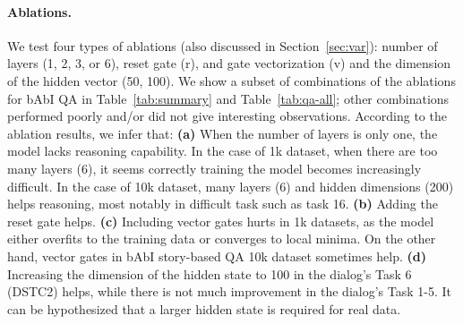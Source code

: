 \documentclass[table]{article}
\begin{document}
\paragraph{Ablations.}
We test four types of ablations (also discussed in Section~\ref{sec:var}): number of layers (1, 2, 3, or 6), reset gate (r), and gate vectorization (v) and the dimension of the hidden vector (50, 100). 
We show a subset of combinations of the ablations for bAbI QA in Table~\ref{tab:summary} and Table~\ref{tab:qa-all}; other combinations performed poorly and/or did not give interesting observations.
According to the ablation results, we  infer that:
{\bf (a)} When the number of layers is only one, the model lacks reasoning capability. In the case of 1k dataset, when there are too many layers (6), it seems correctly training the model becomes increasingly difficult. In the case of 10k dataset, many layers (6) and hidden dimensions (200) helps reasoning, most notably in difficult task such as task 16.
{\bf (b)} Adding the reset gate helps.
{\bf (c)} Including vector gates hurts in 1k datasets, as the model either overfits to the training data or converges to local minima. On the other hand, vector gates in bAbI story-based QA 10k dataset sometimes help.
{\bf (d)} Increasing the dimension of the hidden state to 100 in the dialog's Task 6 (DSTC2) helps, while there is not much improvement in the dialog's Task 1-5. 
It can be hypothesized that a larger hidden state is required for real data.
\end{document}
